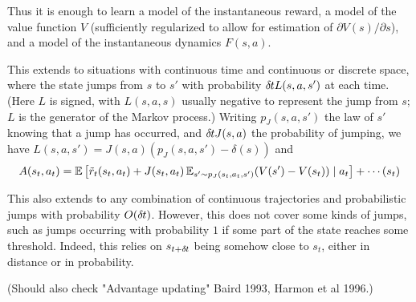 Thus it is enough to learn a model of the instantaneous reward, a model
of the value function $V$ (sufficiently regularized to allow for
estimation of $\partial V(s)/\partial s$), and a model of the
instantaneous dynamics $F(s,a)$.

This extends to situations with continuous time and continuous or
discrete space, where the state jumps from $s$ to $s'$ with probability $\delta\hspace{-.06em}t
L(s,a,s')$ at each time. (Here $L$ is signed, with $L(s,a,s)$ usually
negative to represent the jump from $s$; $L$ is the generator of the
Markov process.) Writing $p_J(s,a,s')$ the law of
$s'$ knowing that a jump has occurred, and $\delta\hspace{-.06em}t J(s,a)$ the
probability of jumping, we have $L(s,a,s')=J(s,a)(p_J(s,a,s')-\delta(s))$
and
\begin{equation}
A(s_t,a_t)=\mathbb{E}\left[\tilde{r}_t(s_t,a_t)+J(s_t,a_t)\,\mathbb{E}_{s'\sim
p_J(s_t,a_t,s')} (V(s')-V(s_t))
\mid a_t\right]+\cdots(s_t)
\end{equation}

This also extends to any combination of continuous trajectories and
probabilistic jumps with probability $O(\delta\hspace{-.06em}t)$. However, this does not
cover some kinds of jumps, such as jumps occurring with probability $1$
if some part of the state reaches some threshold. Indeed, this relies on
$s_{t+\delta\hspace{-.06em}t}$ being somehow close to $s_t$, either in distance or in
probability.

(Should also check "Advantage updating" Baird 1993, Harmon et al 1996.)
